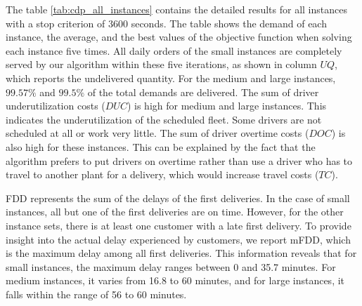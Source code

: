 The table \ref{tab:cdp_all_instances} contains the detailed results for all instances with a stop criterion of 3600 seconds. The table shows the demand of each instance, the average, and the best values of the objective function when solving each instance five times. All daily orders of the small instances are completely served by our algorithm within these five iterations, as shown in column $UQ$, which reports the undelivered quantity. For the medium and large instances, $99.57\%$ and $99.5\%$ of the total demands are delivered. The sum of driver underutilization costs ($DUC$) is high for medium and large instances. This indicates the underutilization of the scheduled fleet. Some drivers are not scheduled at all or work very little. The sum of driver overtime costs ($DOC$) is also high for these instances. This can be explained by the fact that the algorithm prefers to put drivers on overtime rather than use a driver who has to travel to another plant for a delivery, which would increase travel costs ($TC$).

FDD represents the sum of the delays of the first deliveries. In the case of small instances, all but one of the first deliveries are on time. However, for the other instance sets, there is at least one customer with a late first delivery. To provide insight into the actual delay experienced by customers, we report mFDD, which is the maximum delay among all first deliveries. This information reveals that for small instances, the maximum delay ranges between 0 and 35.7 minutes. For medium instances, it varies from 16.8 to 60 minutes, and for large instances, it falls within the range of 56 to 60 minutes.


